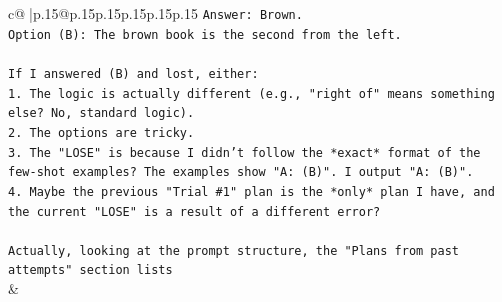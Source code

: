 \documentclass{article}
\begin{document}
{\begin{supertabular}{c@{$\;$}|p{.15\linewidth}@{}p{.15\linewidth}p{.15\linewidth}p{.15\linewidth}p{.15\linewidth}p{.15\linewidth}}
{{{\texttt{Answer: Brown.} \\
\texttt{Option (B): The brown book is the second from the left.} \\
\\ 
\texttt{If I answered (B) and lost, either:} \\
\texttt{1. The logic is actually different (e.g., "right of" means something else? No, standard logic).} \\
\texttt{2. The options are tricky.} \\
\texttt{3. The "LOSE" is because I didn't follow the *exact* format of the few{-}shot examples? The examples show "A: (B)". I output "A: (B)".} \\
\texttt{4. Maybe the previous "Trial \#1" plan is the *only* plan I have, and the current "LOSE" is a result of a different error?} \\
\\ 
\texttt{Actually, looking at the prompt structure, the "Plans from past attempts" section lists} \\
            }
        }
    }
    & \\ \\

\end{supertabular}
}
\end{document}
